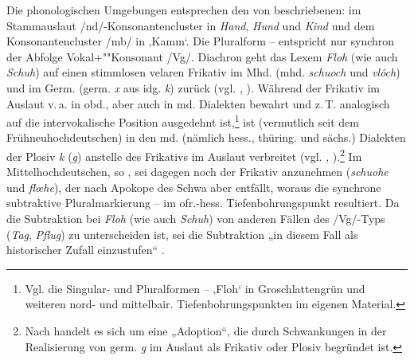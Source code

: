 Die phonologischen Umgebungen entsprechen den von \citet[31, 47]{Birkenes2014} beschriebenen: im Stammauslaut /nd/-Konsonantencluster in \textit{Hand}, \textit{Hund} und \textit{Kind} und dem Konsonantencluster /mb/ in  ‚Kamm‘. Die Pluralform  --  entspricht nur synchron der Abfolge Vo\-kal+""Kon\-so\-nant /Vg/. Diachron geht das Lexem \textit{Floh} (wie auch \textit{Schuh}) auf einen stimmlosen velaren Frikativ im Mhd. (mhd. \textit{schuoch} und \textit{vlôch}) und im Germ. (germ. \textit{x} aus idg. \textit{k}) zurück (vgl. \citealt[91--93]{Birkenes2014}, \citealt[364--365]{Schirmunski1962}). Während der Frikativ im Auslaut v.\,a. in obd., aber auch in md. Dialekten bewahrt und z.\,T. analogisch auf die intervokalische Position ausgedehnt ist,\footnote{Vgl. die Singular- und Pluralformen  --  ‚Floh‘ in Groschlattengrün und weiteren nord- und mittelbair. Tiefenbohrungspunkten im eigenen Material.} ist (vermutlich seit dem Frühneuhochdeutschen) in den md. (nämlich hess., thüring. und sächs.) Dialekten der Plosiv \textit{k} (\textit{g}) anstelle des Frikativs im Auslaut verbreitet (vgl. \citealt[92]{Birkenes2014}, \citealt[365]{Schirmunski1962}).\footnote{Nach \citet[365]{Schirmunski1962} handelt es sich um eine „Adoption“, die durch Schwankungen in der Realisierung von germ. \textit{g} im Auslaut als Frikativ oder Plosiv begründet ist.} Im Mittelhochdeutschen, so \citet[92]{Birkenes2014}, sei dagegen noch der Frikativ anzunehmen (\textit{schuohe} und \textit{flœhe}), der nach Apokope des Schwa aber entfällt, woraus die synchrone subtraktive Pluralmarkierung  --  im ofr.-hess. Tiefenbohrungspunkt resultiert. Da die Subtraktion bei \textit{Floh} (wie auch \textit{Schuh}) von anderen Fällen des /Vg/-Typs (\textit{Tag}, \textit{Pflug}) zu unterscheiden ist, sei die Subtraktion „in diesem Fall als historischer Zufall einzustufen“ \citep[93]{Birkenes2014}.

